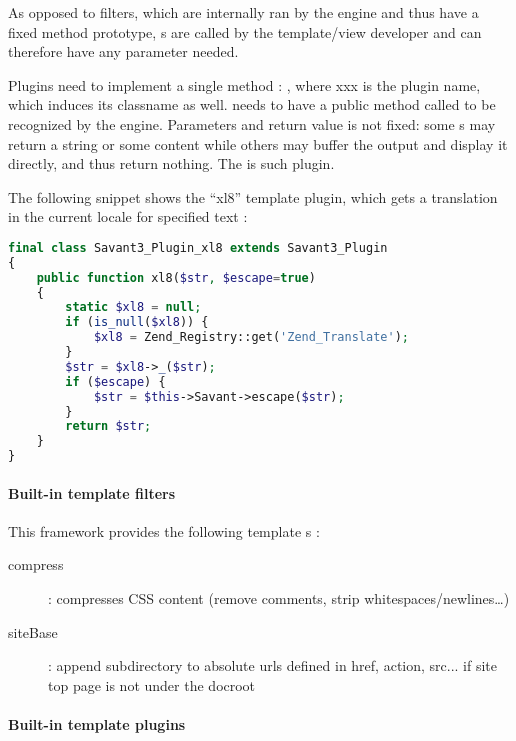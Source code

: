 \documentclass[pdftex,12pt,a4paper]{article}
\begin{document}
As opposed to filters, which are internally ran by the  engine and thus have a fixed method prototype, s are called by the template/view developer and can therefore have any parameter needed.

Plugins need to implement a single method : , where xxx is the plugin name, which induces its classname as well.  needs to have a public method called  to be recognized by the engine. Parameters and return value is not fixed: some s may return a string or some content while others may buffer the output and display it directly, and thus return nothing. The   is such plugin.

The following snippet shows the ``xl8'' template plugin, which gets a  translation in the current locale for specified text :
\begin{lstlisting}[label="xl8-plugin",caption="Code for the Xl8 template plugin",language=PHP]
final class Savant3_Plugin_xl8 extends Savant3_Plugin
{
    public function xl8($str, $escape=true)
    {
        static $xl8 = null;
        if (is_null($xl8)) {
            $xl8 = Zend_Registry::get('Zend_Translate');
        }
        $str = $xl8->_($str);
        if ($escape) {
            $str = $this->Savant->escape($str);
        }
        return $str;
    }
}
\end{lstlisting}

\paragraph{Built-in template filters}

This framework provides the following template s :
\begin{description}
	\item[compress] : compresses CSS content (remove comments, strip whitespaces/newlines\ldots)
	\item[siteBase] : append subdirectory to absolute urls defined in href, action, src... if site top page is not under the docroot
\end{description}

\paragraph{Built-in template plugins} \label{sec:built-in-template-plugins}
\end{document}
